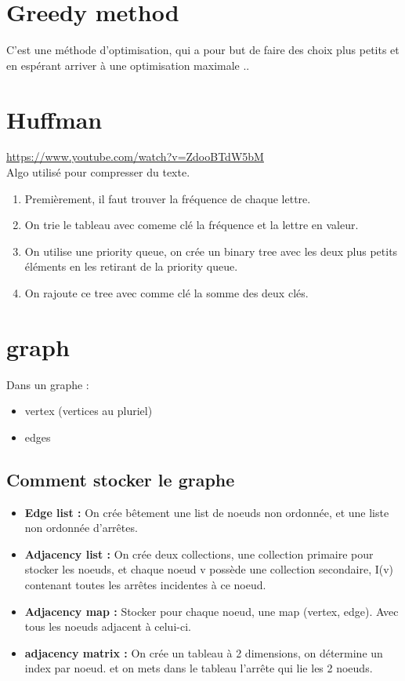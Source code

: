 \documentclass[a4paper]{article}
\begin{document}
\section{Greedy method}
C'est une méthode d'optimisation, qui a pour but de faire des choix plus petits et en espérant arriver à une optimisation maximale .. 

\section{Huffman}
\url{https://www.youtube.com/watch?v=ZdooBTdW5bM}\\
Algo utilisé pour compresser du texte.
\begin{enumerate}
\item Premièrement, il faut trouver la fréquence de chaque lettre.
\item On trie le tableau avec comeme clé la fréquence et la lettre en valeur.
\item On utilise une priority queue, on crée un binary tree avec les deux plus petits éléments en les retirant de la priority queue.
\item On rajoute ce tree avec comme clé la somme des deux clés.
\end{enumerate}

\section{graph}
Dans un graphe :
\begin{itemize}
\item vertex (vertices au pluriel)
\item edges
\end{itemize}

\subsection{Comment stocker le graphe}

\begin{itemize}
\item \textbf{Edge list :}
 On crée bêtement une list de noeuds non ordonnée, et une liste non ordonnée d'arrêtes.
\item \textbf{Adjacency list :}
 On crée deux collections, une collection primaire pour stocker les noeuds, et chaque noeud v possède une collection secondaire, I(v) contenant toutes les arrêtes incidentes à ce noeud.
\item \textbf{Adjacency map :}
 Stocker pour chaque noeud, une map (vertex, edge). Avec tous les noeuds adjacent à celui-ci.
\item \textbf{adjacency matrix :}
On crée un tableau à 2 dimensions, on détermine un index par noeud. et on mets dans le tableau l'arrête qui lie les 2 noeuds.
\end{itemize}
\end{document}

